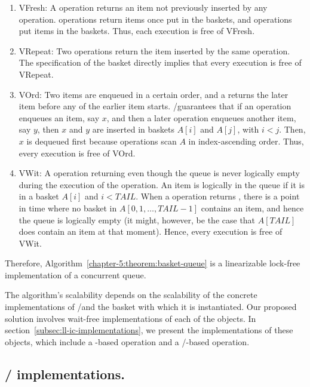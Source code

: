 \begin{proofT}
  \begin{enumerate}
      \item VFresh: A \Deq operation returns an item not previously inserted by any \Enq operation.  \Deq operations return items once put in the baskets, and \Enq operations put items in the baskets. Thus, each execution is free of VFresh.
      \item VRepeat: Two \Deq operations return the item inserted by the same \Enq operation. The specification of the basket directly implies that every execution is free of VRepeat.
      \item VOrd: Two items are enqueued in a certain order, and a \Deq returns the later item before any \Deq of the earlier item starts.  \LL/\IC guarantees that if an \Enq operation enqueues an item, say $x$, and then a later \Enq operation enqueues another item, say $y$, then $x$ and $y$ are inserted in baskets $A[i]$ and $A[j]$, with $i < j$. Then, $x$ is dequeued first because \Deq operations scan $A$ in index-ascending order. Thus, every execution is free of VOrd.
      \item VWit: A \Deq operation returning \epty even though the queue is never logically empty during the execution of the \Deq operation. An item is logically in the queue if it is in a basket $A[i]$ and $i < TAIL$. When a \Deq operation returns \epty, there is a point in time where no basket in $A[0, 1, \hdots, TAIL-1]$ contains an item, and hence the queue is logically empty (it might, however, be the case that $A[TAIL]$ does contain an item at that moment). Hence, every execution is free of VWit.
  \end{enumerate}

  Therefore, Algorithm~\ref{chapter-5:theorem:basket-queue} is a linearizable lock-free implementation of a concurrent queue.
\end{proofT}

The algorithm's scalability depends on the scalability of the concrete implementations of \LL/\IC and the basket with which it is instantiated. Our proposed solution involves wait-free implementations of each of the objects. In section~\ref{subsec:ll-ic-implementations}, we present the implementations of these objects, which include a \CAS-based operation and a \R/\W-based operation.

\subsection{\label{subsec:ll-ic-implementations}\LL/ \IC implementations.}

